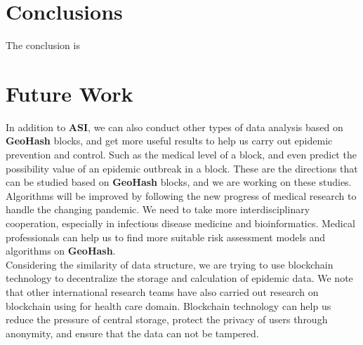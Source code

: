\documentclass[sigplan,screen]{acmart}
\begin{document}
\section{Conclusions}
The conclusion is
\section{Future Work}
In addition to \textbf{ASI}, we can also conduct other types of data analysis based on \textbf{GeoHash} blocks, and get more useful results to help us carry out epidemic prevention and control.
Such as the medical level of a block, and even predict the possibility value of an epidemic outbreak in a block.
These are the directions that can be studied based on \textbf{GeoHash} blocks, and we are working on these studies.
\\
Algorithms will be improved by following the new progress of medical research to handle the changing pandemic.
We need to take more interdisciplinary cooperation, especially in infectious disease medicine and bioinformatics.
Medical professionals can help us to find more suitable risk assessment models and algorithms on \textbf{GeoHash}.
\\
Considering the similarity of data structure, we are trying to use blockchain technology to decentralize the storage and calculation of epidemic data.
We note that other international research teams have also carried out research on blockchain using for health care domain.\cite{nguyen2020blockchain}\cite{CryptocurrencyNewUse2020Coronavirus}
Blockchain technology can help us reduce the pressure of central storage, protect the privacy of users through anonymity\cite{nakamoto2019bitcoin}, and ensure that the data can not be tampered.\cite{armstrong2016move}


\end{document}
